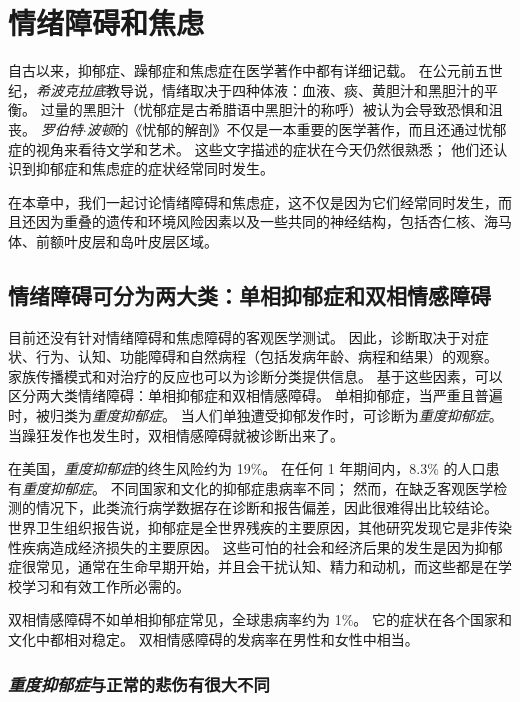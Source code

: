 \chapter{情绪障碍和焦虑} \label{chap:chap61}

自古以来，抑郁症、躁郁症和焦虑症在医学著作中都有详细记载。
在公元前五世纪，\textit{希波克拉底}教导说，情绪取决于四种体液：血液、痰、黄胆汁和黑胆汁的平衡。
过量的黑胆汁（忧郁症是古希腊语中黑胆汁的称呼）被认为会导致恐惧和沮丧。
\textit{罗伯特$\cdot$波顿}的《忧郁的解剖》不仅是一本重要的医学著作，而且还通过忧郁症的视角来看待文学和艺术。
这些文字描述的症状在今天仍然很熟悉；
他们还认识到抑郁症和焦虑症的症状经常同时发生。


在本章中，我们一起讨论情绪障碍和焦虑症，这不仅是因为它们经常同时发生，而且还因为重叠的遗传和环境风险因素以及一些共同的神经结构，包括杏仁核、海马体、前额叶皮层和岛叶皮层区域。



\section{情绪障碍可分为两大类：单相抑郁症和双相情感障碍}

目前还没有针对情绪障碍和焦虑障碍的客观医学测试。
因此，诊断取决于对症状、行为、认知、功能障碍和自然病程（包括发病年龄、病程和结果）的观察。
家族传播模式和对治疗的反应也可以为诊断分类提供信息。
基于这些因素，可以区分两大类情绪障碍：单相抑郁症和双相情感障碍。
单相抑郁症，当严重且普遍时，被归类为\textit{重度抑郁症}。
当人们单独遭受抑郁发作时，可诊断为\textit{重度抑郁症}。
当躁狂发作也发生时，双相情感障碍就被诊断出来了。


在美国，\textit{重度抑郁症}的终生风险约为 19\%。
在任何 1 年期间内，8.3\% 的人口患有\textit{重度抑郁症}。
不同国家和文化的抑郁症患病率不同；
然而，在缺乏客观医学检测的情况下，此类流行病学数据存在诊断和报告偏差，因此很难得出比较结论。
世界卫生组织报告说，抑郁症是全世界残疾的主要原因，其他研究发现它是非传染性疾病造成经济损失的主要原因。
这些可怕的社会和经济后果的发生是因为抑郁症很常见，通常在生命早期开始，并且会干扰认知、精力和动机，而这些都是在学校学习和有效工作所必需的。


双相情感障碍不如单相抑郁症常见，全球患病率约为 1\%。
它的症状在各个国家和文化中都相对稳定。
双相情感障碍的发病率在男性和女性中相当。



\subsection{\textit{重度抑郁症}与正常的悲伤有很大不同}

